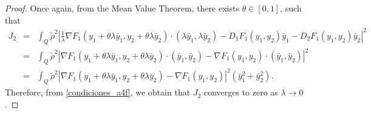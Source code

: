 \documentclass[11pt,a4paper]{amsart}
\numberwithin{equation}{section}
\begin{document}
\begin{proof}
    \noindent Once again, from the Mean Value Theorem, there exists 
    $\theta \in [0,1]$, such that
    \begin{eqnarray*}
    	J_2&=&\int_Q \tilde\rho^2 \left| \frac{1}{\lambda} \nabla F_1(y_1+\theta\lambda\bar y_1,y_2+\theta\lambda\bar y_2)\cdot (\lambda \bar y_1,\lambda \bar y_2) - D_1 F_1(y_1,y_2)\bar y_1 - D_2 F_1(y_1,y_2)\bar y_2 \right|^2\\
        &=& \int_Q \tilde\rho^2 \left| \nabla F_1(y_1+\theta\lambda\bar y_1,y_2+\theta\lambda\bar y_2)\cdot (\bar y_1,\bar y_2) - \nabla F_1(y_1,y_2) \cdot (\bar y_1,\bar y_2) \right|^2\\
        &=& \int_Q \tilde\rho^2 \left| \nabla F_1(y_1+\theta\lambda\bar y_1,y_2+\theta\lambda\bar y_2) - \nabla F_1(y_1,y_2) \right|^2 (\bar y_1^2 + \bar y_2^2 ).
    \end{eqnarray*}
    Therefore, from \eqref{condiciones_a4f}, we obtain that $J_2$ converges to zero as $\lambda \to 0$. 
    

\end{proof}
\end{document}
